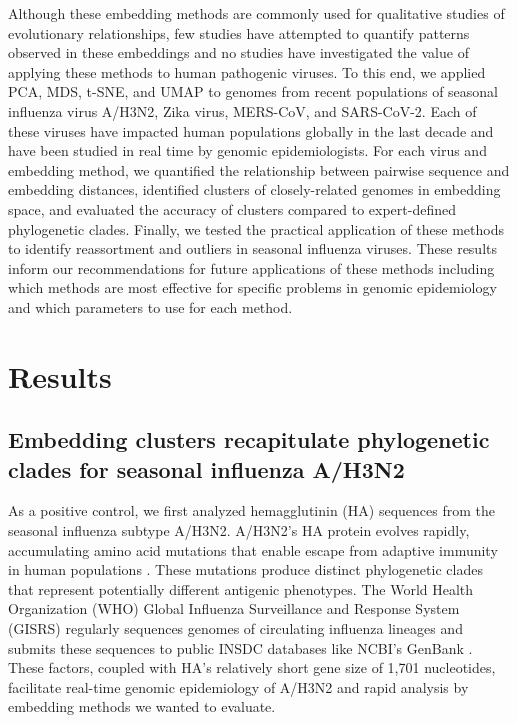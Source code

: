 \documentclass[9pt,lineno]{elife}
\begin{document}
Although these embedding methods are commonly used for qualitative studies of evolutionary relationships, few studies have attempted to quantify patterns observed in these embeddings and no studies have investigated the value of applying these methods to human pathogenic viruses.
To this end, we applied PCA, MDS, t-SNE, and UMAP to genomes from recent populations of seasonal influenza virus A/H3N2, Zika virus, MERS-CoV, and SARS-CoV-2.
Each of these viruses have impacted human populations globally in the last decade and have been studied in real time by genomic epidemiologists.
For each virus and embedding method, we quantified the relationship between pairwise sequence and embedding distances, identified clusters of closely-related genomes in embedding space, and evaluated the accuracy of clusters compared to expert-defined phylogenetic clades.
Finally, we tested the practical application of these methods to identify reassortment and outliers in seasonal influenza viruses.
These results inform our recommendations for future applications of these methods including which methods are most effective for specific problems in genomic epidemiology and which parameters to use for each method.

\section*{Results}

\subsection*{Embedding clusters recapitulate phylogenetic clades for seasonal influenza A/H3N2}

As a positive control, we first analyzed hemagglutinin (HA) sequences from the seasonal influenza subtype A/H3N2.
A/H3N2's HA protein evolves rapidly, accumulating amino acid mutations that enable escape from adaptive immunity in human populations \citep{flu-review}.
These mutations produce distinct phylogenetic clades that represent potentially different antigenic phenotypes.
The World Health Organization (WHO) Global Influenza Surveillance and Response System (GISRS) regularly sequences genomes of circulating influenza lineages \citep{who-gisrs} and submits these sequences to public INSDC databases like NCBI's GenBank \citep{insdc}.
These factors, coupled with HA's relatively short gene size of 1,701 nucleotides, facilitate real-time genomic epidemiology of A/H3N2 \citep{nextflu,nextstrain} and rapid analysis by embedding methods we wanted to evaluate.
\end{document}
